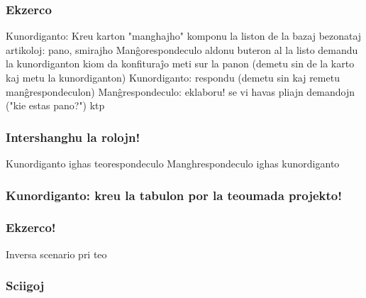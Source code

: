 \documentclass{beamer}
\begin{document}
  \begin{frame}
    \frametitle{Ekzerco}
    Kunordiganto:
        Kreu karton "manghajho"
        komponu la liston de la bazaj bezonataj artikoloj: pano, smirajho
    Manĝorespondeculo
        aldonu buteron al la listo
        demandu la kunordiganton kiom da konfituraĵo meti sur la panon (demetu sin de la karto kaj metu la kunordiganton)
    Kunordiganto:
        respondu (demetu sin kaj remetu manĝrespondeculon)
    Manĝrespondeculo:
        eklaboru! se vi havas pliajn demandojn ("kie estas pano?") ktp
  \end{frame}


  \begin{frame}
    \frametitle{Intershanghu la rolojn!}
    Kunordiganto ighas teorespondeculo
    Manghrespondeculo ighas kunordiganto
  \end{frame}

  \begin{frame}
    \frametitle{Kunordiganto: kreu la tabulon por la teoumada projekto!}
    
  \end{frame}

  \begin{frame}
    \frametitle{Ekzerco!}

    Inversa scenario pri teo
  \end{frame}


  \begin{frame}
    \frametitle{Sciigoj}

  \end{frame}
\end{document}

